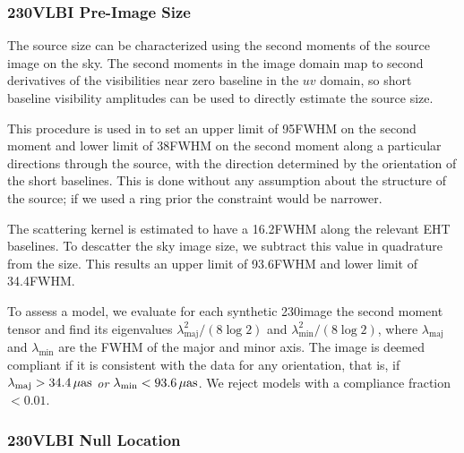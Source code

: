 \subsubsection{230\GHz VLBI Pre-Image Size}



The source size can be characterized using the second moments of the
source image on the sky.
The second moments in the image domain map to second derivatives of
the visibilities near zero baseline in the $uv$ domain, so short
baseline visibility amplitudes can be used to directly estimate the
source size.

This procedure is used in  to set an upper limit
of 95\uas FWHM on the second moment and lower limit of 38\uas FWHM on
the second moment along a particular directions through the source,
with the direction determined by the orientation of the short
baselines.
This is done without any assumption about the structure of the source;
if we used a ring prior the constraint would be narrower.

The scattering kernel is estimated to have a 16.2\uas FWHM along the
relevant EHT baselines.
To descatter the sky image size, we subtract this value in quadrature
from the size.
This results an upper limit of 93.6\uas FWHM and lower limit of
34.4\uas FWHM.

To assess a model, we evaluate for each synthetic 230\GHz image the
second moment tensor and find its eigenvalues
$\lambda_\mathrm{maj}^2/(8\log 2)$ and $\lambda_\mathrm{min}^2/(8\log
2)$, where $\lambda_\mathrm{maj}$ and $\lambda_\mathrm{min}$ are the
FWHM of the major and minor axis.
The image is deemed compliant if it is consistent with the data for
any orientation, that is, if $\lambda_\mathrm{maj} > 34.4\,\mathrm{\mu as}$ \emph{or}
$\lambda_\mathrm{min} < 93.6\,\mathrm{\mu as}$.
We reject models with a compliance fraction $< 0.01$.

\subsubsection{230\GHz VLBI Null Location}


